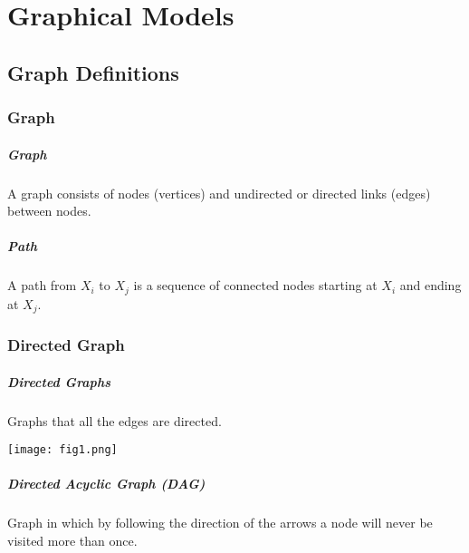
\graphicspath{{Chapter11/Figs/}}

\chapter{Graphical Models}
\label{chapter11}



\section{Graph Definitions}
\label{section11.1}

\subsection{Graph}

\paragraph{Graph}

A graph consists of nodes (vertices) and undirected or directed links (edges) between nodes.

\paragraph{Path}

A path from $X_i$ to $X_j$ is a sequence of connected nodes starting at $X_i$ and ending at $X_j$.

\subsection{Directed Graph}

\paragraph{Directed Graphs}

Graphs that all the edges are directed.
\begin{figure*}[h]
	\centering
	\texttt{[image: fig1.png]}
\end{figure*}

\paragraph{Directed Acyclic Graph (DAG)}

Graph in which by following the direction of the arrows a node will never be visited more than once.

